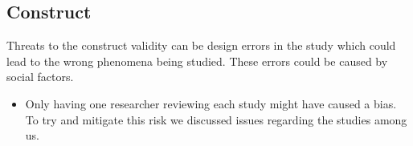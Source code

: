 \subsection{Construct}
Threats to the construct validity can be design errors in the study which could lead to the wrong phenomena being studied. These errors could be caused by social factors.
\begin{itemize}
\item Only having one researcher reviewing each study might have caused a bias. To try and mitigate this risk we discussed issues regarding the studies among us.    
\end{itemize}
